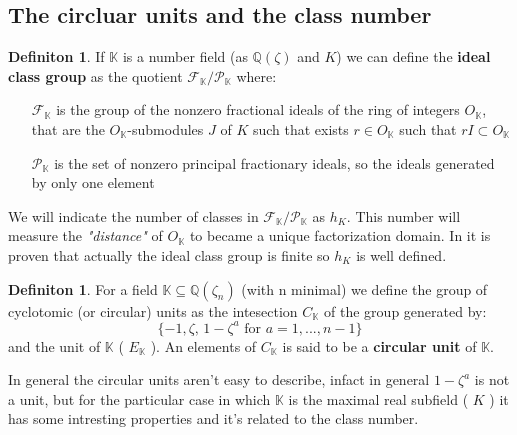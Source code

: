 \documentclass[]{article}
\theoremstyle{plain}
\theoremstyle{remark}
\theoremstyle{definition}
\newtheorem{deff}[teo]{Definiton}
\newcommand{\K}{\mathbb{K}}
\newcommand{\Q}{\mathbb{Q}}
\begin{document}
	\subsection{The circluar units and the class number}

	\begin{deff}
		If $ \K $ is a number field (as $ \Q (\zeta) $ and $ K $)  we can define the \textbf{ideal class group} as the quotient $ \mathcal{F}_\K / \mathcal{P}_\K $ where:
	\begin{itemize}
		\item[$ \mathcal{F}_\K $] is the group of the nonzero fractional ideals of the ring of integers  $ O_\K $, that are the $ O_\K  $-submodules $ J $ of $ K $ such that exists $ r \in O_\K  $ such that $ r I \subset O_\K  $
		\item[$ \mathcal{P}_\K $] is the set of nonzero principal fractionary ideals, so the ideals generated by only one element
	\end{itemize}
	\end{deff}


	We will indicate the number of classes in $ \mathcal{F}_\K / \mathcal{P}_\K $ as $ h_K $. This number will measure the \textit{"distance"} of $ O_\K $ to became a unique factorization domain. In \cite[Page~141]{RIN} it is proven that actually the ideal class group is finite so $ h_K $ is well defined. 

	
	\begin{deff}
		For a field $ \K \subseteq \Q (\zeta_n) $ (with n minimal) we define the group of cyclotomic (or circular) units as the intesection $ C_\K $ of the group generated by:
		\begin{equation*}
			\{ -1 ,  \zeta , \, 1 - \zeta ^a \text{ for } a = 1, ... , n-1 \}
		\end{equation*}
		and the unit of $ \K $ ( $ E_{\K} $ ). An elements of $ C_\K $ is said to be a \textbf{circular unit} of $ \K $. 
	\end{deff}

	In general the circular units aren't easy to describe, infact in general $ 1 - \zeta ^a $ is not a unit, but for the particular case in which $ \K $ is the maximal real subfield ( $ K $ ) it has some intresting properties and it's related to the class number.
	
\end{document}
